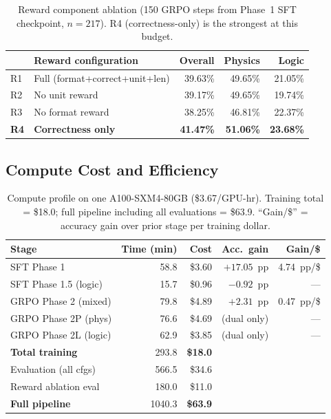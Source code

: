 \documentclass{ieeeaccess}
\begin{document}
\begin{table}[t]
  \centering
  \caption{Reward component ablation (150 GRPO steps from Phase~1 SFT
           checkpoint, $n=217$). R4 (correctness-only) is the strongest
           at this budget.}
  \label{tab:reward_ablation}
  \begin{tabular}{llrrr}
    \toprule
    & \textbf{Reward configuration} & \textbf{Overall} & \textbf{Physics} & \textbf{Logic} \\
    \midrule
    R1 & Full (format+correct+unit+len) & 39.63\% & 49.65\% & 21.05\% \\
    R2 & No unit reward               & 39.17\% & 49.65\% & 19.74\% \\
    R3 & No format reward             & 38.25\% & 46.81\% & 22.37\% \\
    \textbf{R4} & \textbf{Correctness only} & \textbf{41.47\%} & \textbf{51.06\%} & \textbf{23.68\%} \\
    \bottomrule
  \end{tabular}
\end{table}

\subsection{Compute Cost and Efficiency}

\begin{table}[t]
  \centering
  \caption{Compute profile on one A100-SXM4-80GB (\$3.67/GPU-hr).
           Training total = \$18.0; full pipeline including all evaluations
           = \$63.9. ``Gain/\$'' = accuracy gain over prior stage per
           training dollar.}
  \label{tab:compute}
  \begin{tabular}{lrrrr}
    \toprule
    \textbf{Stage} & \textbf{Time (min)} & \textbf{Cost} & \textbf{Acc.\ gain} & \textbf{Gain/\$} \\
    \midrule
    SFT Phase 1           & 58.8  & \$3.60  & $+17.05$~pp & 4.74~pp/\$ \\
    SFT Phase 1.5 (logic) & 15.7  & \$0.96  & $-0.92$~pp  & --- \\
    GRPO Phase 2 (mixed)  & 79.8  & \$4.89  & $+2.31$~pp  & 0.47~pp/\$ \\
    GRPO Phase 2P (phys)  & 76.6  & \$4.69  & (dual only) & --- \\
    GRPO Phase 2L (logic) & 62.9  & \$3.85  & (dual only) & --- \\
    \midrule
    \textbf{Total training} & 293.8 & \textbf{\$18.0} & & \\
    Evaluation (all cfgs) & 566.5 & \$34.6  & & \\
    Reward ablation eval  & 180.0 & \$11.0  & & \\
    \midrule
    \textbf{Full pipeline} & 1040.3 & \textbf{\$63.9} & & \\
    \bottomrule
  \end{tabular}
\end{table}
\end{document}

